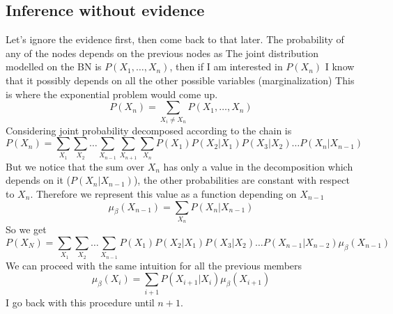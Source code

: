     \subsection{Inference without evidence}
        Let's ignore the evidence first, then come back to that later.
        The probability of any of the nodes depends on the previous nodes as
        The joint distribution modelled on the BN is $P(X_1, \dots, X_n)$, then if I am interested in $P(X_n)$ I know that it possibly depends on all the other possible variables (marginalization)
        This is where the exponential problem would come up. 
        $$P(X_n) = \sum_{X_i \neq X_n} P(X_1, \dots, X_n)$$ 
        Considering joint probability decomposed according to the chain is
        $$P(X_n) = \sum_{X_1} \sum_{X_2} \dots \sum_{X_{n-1}} \sum_{X_{n+1}} \sum_{X_n} P(X_1)P(X_2|X_1)P(X_3|X_2)\dots P(X_n|X_{n-1})$$
        But we notice that the sum over $X_n$ has only a value in the decomposition which depends on it ($P(X_n|X_{n-1})$), the other probabilities are constant with respect to $X_n$. Therefore we represent this value as a function depending on $X_{n-1}$
        $$\mu_\beta (X_{n-1}) = \sum _{X_n} P(X_n|X_{n-1})$$
        So we get
        $$P(X_N) = \sum_{X_1} \sum_{X_2} \dots \sum_{X_{n-1}} P(X_1)P(X_2|X_1)P(X_3|X_2)\dots P(X_{n-1}|X_{n-2}) \mu_\beta (X_{n-1})$$
        We can proceed with the same intuition for all the previous members
        $$\mu_\beta (X_{i}) = \sum_{i+1} P(X_{i+1}|X_i)\mu_\beta(X_{i+1})$$
        I go back with this procedure until $n+1$.\\
        
